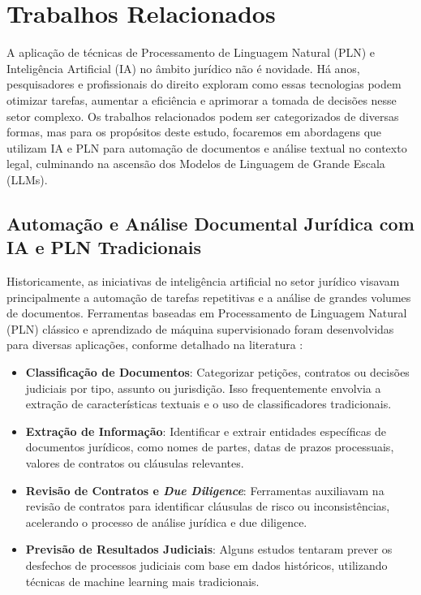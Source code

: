 \chapter{Trabalhos Relacionados}
\label{cap:trabalhos-relacionados}

A aplicação de técnicas de Processamento de Linguagem Natural (PLN) e Inteligência Artificial (IA) no âmbito jurídico não é novidade. Há anos, pesquisadores e profissionais do direito exploram como essas tecnologias podem otimizar tarefas, aumentar a eficiência e aprimorar a tomada de decisões nesse setor complexo. Os trabalhos relacionados podem ser categorizados de diversas formas, mas para os propósitos deste estudo, focaremos em abordagens que utilizam IA e PLN para automação de documentos e análise textual no contexto legal, culminando na ascensão dos Modelos de Linguagem de Grande Escala (LLMs).

\section{Automação e Análise Documental Jurídica com IA e PLN Tradicionais}
\label{sec:automacao-analise-docmental-juridico}

Historicamente, as iniciativas de inteligência artificial no setor jurídico visavam principalmente a automação de tarefas repetitivas e a análise de grandes volumes de documentos. Ferramentas baseadas em Processamento de Linguagem Natural (PLN) clássico e aprendizado de máquina supervisionado foram desenvolvidas para diversas aplicações, conforme detalhado na literatura \cite{katz_natural_2023}:

\begin{itemize}
    \item \textbf{Classificação de Documentos}: Categorizar petições, contratos ou decisões judiciais por tipo, assunto ou jurisdição. Isso frequentemente envolvia a extração de características textuais e o uso de classificadores tradicionais.
    
    \item \textbf{Extração de Informação}: Identificar e extrair entidades específicas de documentos jurídicos, como nomes de partes, datas de prazos processuais, valores de contratos ou cláusulas relevantes.
    
    \item \textbf{Revisão de Contratos e \textit{Due Diligence}}: Ferramentas auxiliavam na revisão de contratos para identificar cláusulas de risco ou inconsistências, acelerando o processo de análise jurídica e due diligence.
    
    \item \textbf{Previsão de Resultados Judiciais}: Alguns estudos tentaram prever os desfechos de processos judiciais com base em dados históricos, utilizando técnicas de machine learning mais tradicionais.
\end{itemize}

